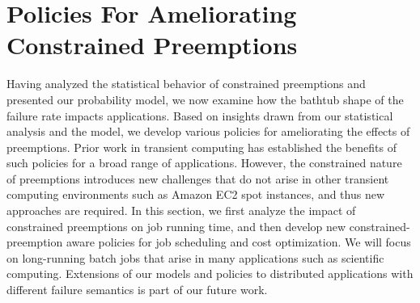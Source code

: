 \vspace*{\subsecspace}
\section{Policies For Ameliorating Constrained Preemptions}
\label{sec:policies}
Having analyzed the statistical behavior of constrained preemptions and presented our probability model, we now examine how the bathtub shape of the failure rate impacts applications. 
Based on insights drawn from our statistical analysis and the model, we develop various policies for ameliorating the effects of preemptions. 
Prior work in transient computing has established the benefits of such policies for a broad range of applications. 
However, the constrained nature of preemptions introduces new challenges that do not arise in other transient computing environments such as Amazon EC2 spot instances, and thus new approaches are required. 
In this section, we first analyze the impact of constrained preemptions on job running time, and then develop new constrained-preemption aware policies for job scheduling and cost optimization. 
We will focus on long-running batch jobs that arise in many applications such as scientific computing. Extensions of our models and policies to distributed applications with different failure semantics is part of our future work. 








